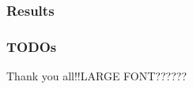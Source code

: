 \documentclass{beamer}
\begin{document}
	\begin{frame}
		\frametitle{Results} 	
	\end{frame}	
	\begin{frame}
		\frametitle{TODOs}	
	\end{frame}	
	\begin{frame}
		Thank you all!!{LARGE FONT??????}
	\end{frame}	
\end{document}
